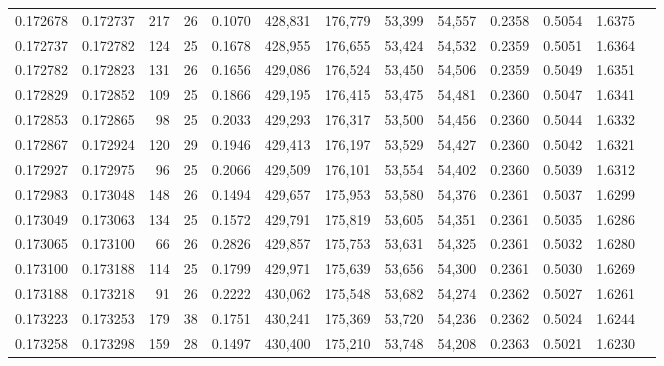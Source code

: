 \begin{tabular}{rrrrrrrrrrrrr}
0.172678 & 0.172737 & 217 &  26 &                                     0.1070 & 428,831 & 176,779 &  53,399 &  54,557 & 0.2358 & 0.5054 & 1.6375 \\
0.172737 & 0.172782 & 124 &  25 &                                     0.1678 & 428,955 & 176,655 &  53,424 &  54,532 & 0.2359 & 0.5051 & 1.6364 \\
0.172782 & 0.172823 & 131 &  26 &                                     0.1656 & 429,086 & 176,524 &  53,450 &  54,506 & 0.2359 & 0.5049 & 1.6351 \\
0.172829 & 0.172852 & 109 &  25 &                                     0.1866 & 429,195 & 176,415 &  53,475 &  54,481 & 0.2360 & 0.5047 & 1.6341 \\
0.172853 & 0.172865 &  98 &  25 &                                     0.2033 & 429,293 & 176,317 &  53,500 &  54,456 & 0.2360 & 0.5044 & 1.6332 \\
0.172867 & 0.172924 & 120 &  29 &                                     0.1946 & 429,413 & 176,197 &  53,529 &  54,427 & 0.2360 & 0.5042 & 1.6321 \\
0.172927 & 0.172975 &  96 &  25 &                                     0.2066 & 429,509 & 176,101 &  53,554 &  54,402 & 0.2360 & 0.5039 & 1.6312 \\
0.172983 & 0.173048 & 148 &  26 &                                     0.1494 & 429,657 & 175,953 &  53,580 &  54,376 & 0.2361 & 0.5037 & 1.6299 \\
0.173049 & 0.173063 & 134 &  25 &                                     0.1572 & 429,791 & 175,819 &  53,605 &  54,351 & 0.2361 & 0.5035 & 1.6286 \\
0.173065 & 0.173100 &  66 &  26 &                                     0.2826 & 429,857 & 175,753 &  53,631 &  54,325 & 0.2361 & 0.5032 & 1.6280 \\
0.173100 & 0.173188 & 114 &  25 &                                     0.1799 & 429,971 & 175,639 &  53,656 &  54,300 & 0.2361 & 0.5030 & 1.6269 \\
0.173188 & 0.173218 &  91 &  26 &                                     0.2222 & 430,062 & 175,548 &  53,682 &  54,274 & 0.2362 & 0.5027 & 1.6261 \\
0.173223 & 0.173253 & 179 &  38 &                                     0.1751 & 430,241 & 175,369 &  53,720 &  54,236 & 0.2362 & 0.5024 & 1.6244 \\
0.173258 & 0.173298 & 159 &  28 &                                     0.1497 & 430,400 & 175,210 &  53,748 &  54,208 & 0.2363 & 0.5021 & 1.6230 \\

\end{tabular}
